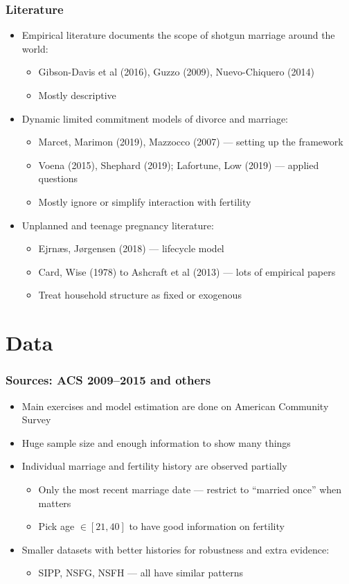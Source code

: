 \documentclass[aspectratio=169]{beamer}
\let\olditem\item
\renewcommand{\item}{%
\olditem\vspace{\fill}}
\begin{document}
\begin{frame}
\frametitle{Literature}
\begin{itemize}
\item Empirical literature documents the scope of shotgun marriage around the world:
\begin{itemize}
\item Gibson-Davis et al (2016), Guzzo (2009),  Nuevo-Chiquero (2014)
\item Mostly descriptive
\end{itemize}
\item Dynamic limited commitment models of divorce and marriage:
\begin{itemize}
\item Marcet, Marimon (2019), Mazzocco (2007) --- setting up the framework
\item Voena (2015), Shephard (2019); Lafortune, Low  (2019) --- applied questions
\item Mostly ignore or simplify interaction with fertility
\end{itemize}
\item Unplanned and teenage pregnancy literature:
\begin{itemize}
\item Ejrnæs, Jørgensen (2018) --- lifecycle model
\item Card, Wise (1978) to Ashcraft et al (2013) --- lots of empirical papers
\item Treat household structure as fixed or exogenous
\end{itemize}
\end{itemize}
\end{frame}




\section{Data}
\begin{frame}
\frametitle{Sources: ACS 2009--2015 and others}
\begin{itemize}
\item Main exercises and model estimation are done on American Community Survey
\item Huge sample size and enough information to show many things 
\item Individual marriage and fertility history are observed partially
\begin{itemize}
\item Only the most recent marriage date --- restrict to ``married once'' when matters
\item Pick age $\in [21,40]$ to have good information on fertility
\end{itemize}
\item Smaller datasets with better histories for robustness and extra evidence:
\begin{itemize}
\item SIPP, NSFG, NSFH --- all have similar patterns
\end{itemize}
\end{itemize}
\end{frame}
\end{document}
